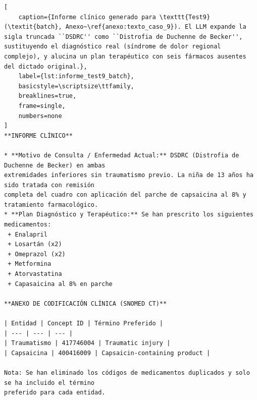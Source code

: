 \begin{lstlisting}[
    caption={Informe clínico generado para \texttt{Test9} (\textit{batch}, Anexo~\ref{anexo:texto_caso_9}). El LLM expande la sigla truncada ``DSDRC'' como ``Distrofia de Duchenne de Becker'', sustituyendo el diagnóstico real (síndrome de dolor regional complejo), y alucina un plan terapéutico con seis fármacos ausentes del dictado original.},
    label={lst:informe_test9_batch},
    basicstyle=\scriptsize\ttfamily,
    breaklines=true,
    frame=single,
    numbers=none
]
**INFORME CLÍNICO**

* **Motivo de Consulta / Enfermedad Actual:** DSDRC (Distrofia de Duchenne de Becker) en ambas
extremidades inferiores sin traumatismo previo. La niña de 13 años ha sido tratada con remisión
completa del cuadro con aplicación del parche de capsaicina al 8% y tratamiento farmacológico.
* **Plan Diagnóstico y Terapéutico:** Se han prescrito los siguientes medicamentos:
 + Enalapril
 + Losartán (x2)
 + Omeprazol (x2)
 + Metformina
 + Atorvastatina
 + Capasaicina al 8% en parche

**ANEXO DE CODIFICACIÓN CLÍNICA (SNOMED CT)**

| Entidad | Concept ID | Término Preferido |
| --- | --- | --- |
| Traumatismo | 417746004 | Traumatic injury |
| Capsaicina | 400416009 | Capsaicin-containing product |

Nota: Se han eliminado los códigos de medicamentos duplicados y solo se ha incluido el término
preferido para cada entidad.
\end{lstlisting}

